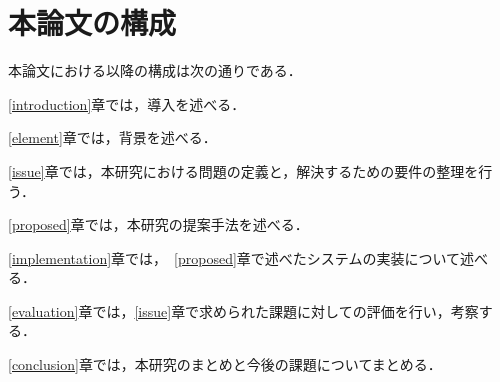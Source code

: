 \section{本論文の構成}

本論文における以降の構成は次の通りである．

\ref{introduction}章では，導入を述べる．

\ref{element}章では，背景を述べる．

\ref{issue}章では，本研究における問題の定義と，解決するための要件の整理を行う．

\ref{proposed}章では，本研究の提案手法を述べる．

\ref{implementation}章では，~\ref{proposed}章で述べたシステムの実装について述べる．

\ref{evaluation}章では，\ref{issue}章で求められた課題に対しての評価を行い，考察する．

\ref{conclusion}章では，本研究のまとめと今後の課題についてまとめる．